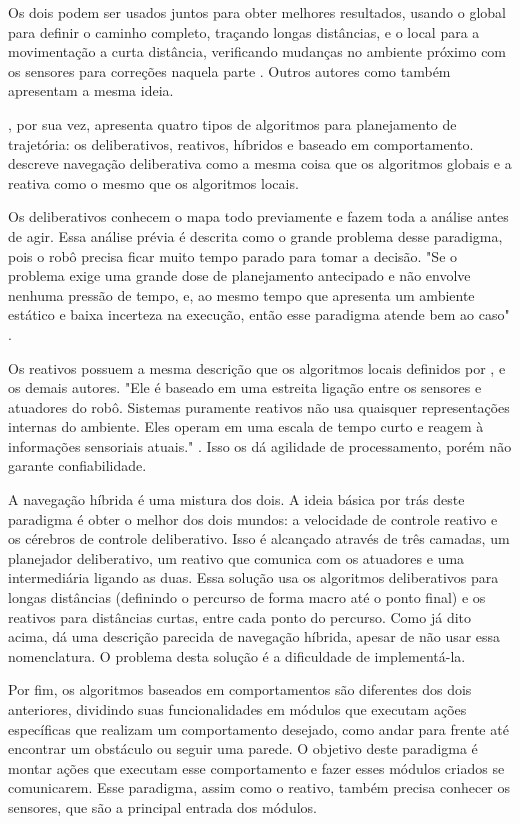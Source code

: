 Os dois podem ser usados juntos para obter melhores resultados, usando o global para definir o caminho completo, traçando longas distâncias, e o local para a movimentação a curta distância, verificando mudanças no ambiente próximo com os sensores para correções naquela parte \cite{Souza2008}. Outros autores como \cite{Secchi2008} também apresentam a mesma ideia.

\cite{Mataric2007}, por sua vez, apresenta quatro tipos de algoritmos para planejamento de trajetória: os deliberativos, reativos, híbridos e baseado em comportamento. \cite{Guzman2008} descreve navegação deliberativa como a mesma coisa que os algoritmos globais e a reativa como o mesmo que os algoritmos locais.

Os deliberativos conhecem o mapa todo previamente e fazem toda a análise antes de agir. Essa análise prévia é descrita como o grande problema desse paradigma, pois o robô precisa ficar muito tempo parado para tomar a decisão. "Se o problema exige uma grande dose de planejamento antecipado e não envolve nenhuma pressão de tempo, e, ao mesmo tempo que apresenta um ambiente estático e baixa incerteza na execução, então esse paradigma atende bem ao caso" \cite{Mataric2007}. 

Os reativos possuem a mesma descrição que os algoritmos locais definidos por \cite{Guzman2008}, \cite{Souza2008} e os demais autores. "Ele é baseado em uma estreita ligação entre os sensores e atuadores do robô. Sistemas puramente reativos não usa quaisquer representações internas do ambiente. Eles operam em uma escala de tempo curto e reagem à informações sensoriais atuais." \cite{Mataric2007}. Isso os dá agilidade de processamento, porém não garante confiabilidade.

A navegação híbrida é uma mistura dos dois. A ideia básica por trás deste paradigma é obter o melhor dos dois mundos: a velocidade de controle reativo e os cérebros de controle deliberativo. Isso é alcançado através de três camadas, um planejador deliberativo, um reativo que comunica com os atuadores e uma intermediária ligando as duas. Essa solução usa os algoritmos deliberativos para longas distâncias (definindo o percurso de forma macro até o ponto final) e os reativos para distâncias curtas, entre cada ponto do percurso. Como já dito acima, \cite{Souza2008} dá uma descrição parecida de navegação híbrida, apesar de não usar essa nomenclatura. O problema desta solução é a dificuldade de implementá-la.

Por fim, os algoritmos baseados em comportamentos são diferentes dos dois anteriores, dividindo suas funcionalidades em módulos que executam ações específicas que realizam um comportamento desejado, como andar para frente até encontrar um obstáculo ou seguir uma parede. O objetivo deste paradigma é montar ações que executam esse comportamento e fazer esses módulos criados se comunicarem. Esse paradigma, assim como o reativo, também precisa conhecer os sensores, que são a principal entrada dos módulos.


